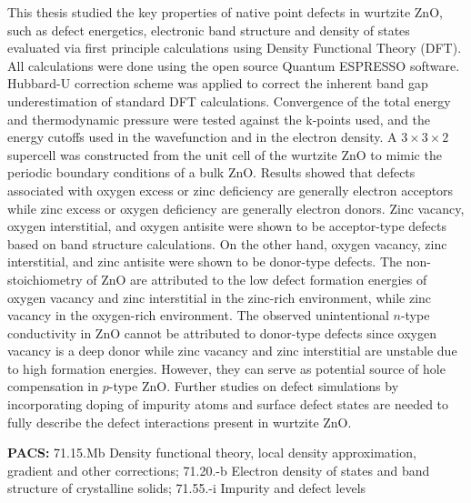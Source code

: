 This thesis studied the key properties of native point defects in wurtzite ZnO, such as  defect energetics, electronic band structure and density of states evaluated via first principle calculations using Density Functional Theory (DFT). All calculations were done using the open source Quantum ESPRESSO software. Hubbard-U correction scheme was applied to correct the inherent band gap underestimation of standard DFT calculations. Convergence of the total energy and thermodynamic pressure were tested against the k-points used, and the energy cutoffs used in the wavefunction and in the electron density.
A $3 \times 3 \times 2$ supercell was constructed from the unit cell of the wurtzite ZnO to mimic the periodic boundary conditions of a bulk ZnO. Results showed that defects associated with oxygen excess  or zinc deficiency are generally electron acceptors while zinc excess or oxygen deficiency are generally electron donors.  Zinc vacancy, oxygen interstitial, and oxygen antisite were shown to be acceptor-type defects based on band structure calculations. On the other hand, oxygen vacancy, zinc interstitial, and zinc antisite were shown to be donor-type defects. The non-stoichiometry of ZnO are attributed to the low defect formation energies of oxygen vacancy and zinc interstitial in the zinc-rich environment, while zinc vacancy in the oxygen-rich environment. The observed unintentional $n$-type conductivity in ZnO cannot be attributed to donor-type defects since oxygen vacancy is a deep donor while zinc vacancy and zinc interstitial are unstable due to high formation energies. However, they can serve as potential source of hole compensation in $p$-type ZnO. Further studies on defect simulations by incorporating doping of impurity atoms and surface defect states are needed to fully describe the defect interactions present in wurtzite ZnO.  

\begingroup
\noindent
\textbf{PACS:} 71.15.Mb Density functional theory, local density approximation, gradient and other corrections; 71.20.-b Electron density of states and band structure of crystalline solids; 71.55.-i Impurity and defect levels
\endgroup